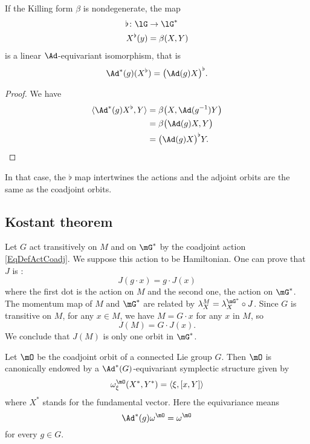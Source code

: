\begin{lemma}
	If the Killing form $\beta$ is nondegenerate, the map
	\begin{equation}
		\begin{aligned}
			\flat\colon \lG & \to \lG^*   \\
			X^{\flat}(y)    & =\beta(X,Y)
		\end{aligned}
	\end{equation}
	is a linear $\Ad$-equivariant isomorphism, that is
	\begin{equation}
		\Ad^*(g)(X^{\flat})=\big( \Ad(g)X \big)^{\flat}.
	\end{equation}
\end{lemma}

\begin{proof}
	We have
	\begin{equation}
		\begin{aligned}[]
			\langle \Ad^*(g)X^{\flat}, Y\rangle & =\beta\big( X,\Ad(g^{-1})Y \big) \\
			                                    & =\beta\big( \Ad(g)X,Y \big)      \\
			                                    & =\big( \Ad(g)X \big)^{\flat}Y.
		\end{aligned}
	\end{equation}
\end{proof}
In that case, the $\flat$ map intertwines the actions and the adjoint orbits are the same as the coadjoint orbits.


\subsection{Kostant theorem}

Let $G$ act transitively on $M$ and on $\mG^*$ by the coadjoint action \eqref{EqDefActCoadj}. We suppose this action to be Hamiltonian. One can prove that $J$ is :
\begin{equation}
	J(g\cdot x)=g\cdot J(x)
\end{equation}
where the first dot is the action on $M$ and the second one, the action on $\mG^*$. The momentum map of $M$ and $\mG^*$ are related by $\lambda_X^M=\lambda_X^{\mG^*}\circ J$. Since $G$ is transitive on $M$, for any $x\in M$, we have $M=G\cdot x$ for any $x$ in $M$, so
\[
	J(M)=G\cdot J(x).
\]
We conclude that $J(M)$ is only one orbit in $\mG^*$.

\begin{proposition}
	Let $\mO$ be the coadjoint orbit of a connected Lie group $G$. Then $\mO$ is canonically endowed by a $\Ad^*(G)$-equivariant symplectic structure given by
	\begin{equation}		\label{EqKKSsymple}
		\omega^{\mO}_{\xi}(X^*,Y^*)=\langle \xi, [x,Y]\rangle
	\end{equation}
	where $X^*$ stands for the fundamental vector. Here the equivariance means
	\begin{equation}
		\Ad^*(g)\omega^{\mO}=\omega^{\mO}
	\end{equation}
	for every $g\in G$.
\end{proposition}

